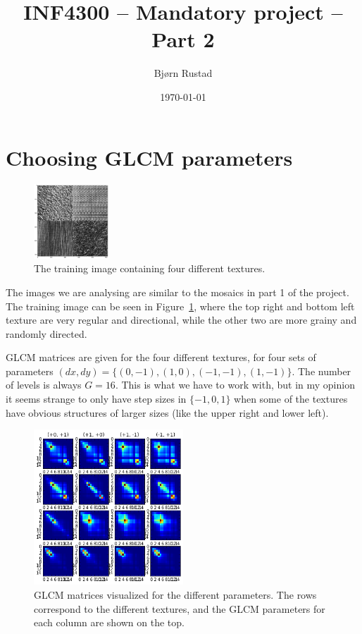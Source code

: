 \documentclass[a4paper]{article}
\title{INF4300 -- Mandatory project -- Part 2}
\author{Bjørn Rustad}
\date{\today}
\begin{document}
\maketitle

\section{Choosing GLCM parameters}

\begin{figure}[h]
    \centering
    \includegraphics[width=0.25\textwidth]{mosaic1.png}
    \caption{The training image containing four different textures.}
    \label{fig:train_tex}
\end{figure}

The images we are analysing are similar to the mosaics in part 1 of the
project. The training image can be seen in Figure~\ref{fig:train_tex},
where the top right and bottom left texture are very regular and
directional, while the other two are more grainy and randomly directed.

GLCM matrices are given for the four different textures, for four sets
of parameters $(dx, dy) = \{(0, -1), (1, 0), (-1, -1), (1, -1)\}$. The
number of levels is always $G = 16$. This is what we have to work with,
but in my opinion it seems strange to only have step sizes in $\{-1, 0,
1\}$ when some of the textures have obvious structures of larger sizes
(like the upper right and lower left).

\begin{figure}
    \centering
    \includegraphics[width=0.5\textwidth]{glcm_mat.png}
    \caption{%
        GLCM matrices visualized for the different parameters. The rows
        correspond to the different textures, and the GLCM parameters
        for each column are shown on the top.
    }
    \label{fig:glcm_mat}
\end{figure}
\end{document}
